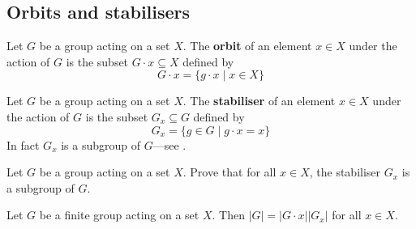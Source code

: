 \todo{}

\subsection*{Orbits and stabilisers}

\todo{}

\begin{definition}
\label{defOrbit}
Let $G$ be a group acting on a set $X$. The \textbf{orbit} of an element $x \in X$ under the action of $G$ is the subset $G \cdot x \subseteq X$ defined by
\[ G \cdot x = \{ g \cdot x \mid x \in X \} \]
\end{definition}

\todo{}

\begin{definition}
\label{defStabiliser}
Let $G$ be a group acting on a set $X$. The \textbf{stabiliser} of an element $x \in X$ under the action of $G$ is the subset $G_x \subseteq G$ defined by
\[ G_x = \{ g \in G \mid g \cdot x = x \} \]
In fact $G_x$ is a subgroup of $G$---see .
\end{definition}

\begin{exercise}
Let $G$ be a group acting on a set $X$. Prove that for all $x \in X$, the stabiliser $G_x$ is a subgroup of $G$.
\end{exercise}

\todo{}

\begin{theorem}
\label{thmOrbitStabiliser}
Let $G$ be a finite group acting on a set $X$. Then $|G| = |G \cdot x| |G_x|$ for all $x \in X$.
\end{theorem}

